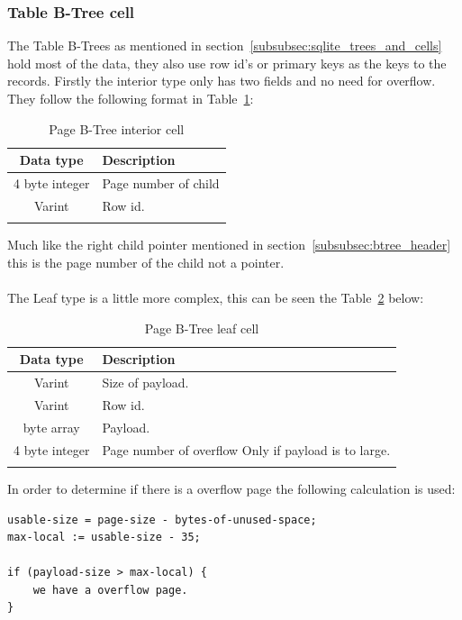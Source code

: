 \subsubsection{Table B-Tree cell}
\label{subsubsec:table_btree_cell}

The Table B-Trees as mentioned in section~\ref{subsubsec:sqlite_trees_and_cells} hold most of the data, they also use row id's or primary keys as the keys to the records. Firstly the interior type only has two fields and no need for overflow. They follow the following format in Table~\ref{tbl:table_btree_cell_interior}: 

\begin{longtable}[h]{| c | p{5cm} |}
		\hline
			\textbf{Data type} & \textbf{Description} \\ 
		\hline
		\endhead
			4 byte integer & Page number of child \\
		\hline
			Varint & Row id. \\
		\hline
	\caption{Page B-Tree interior cell}
	\label{tbl:table_btree_cell_interior}
\end{longtable}

Much like the right child pointer mentioned in section~\ref{subsubsec:btree_header} this is the page number of the child not a pointer. 
\\\\
The Leaf type is a little more complex, this can be seen the Table~\ref{tbl:table_btree_cell_leaf} below:

\begin{longtable}[h]{| c | p{5cm} |}
		\hline
			\textbf{Data type} & \textbf{Description} \\ 
		\hline
		\endhead
			Varint & Size of payload. \\
		\hline
			Varint & Row id. \\
		\hline
			byte array & Payload. \\
		\hline
			4 byte integer & Page number of overflow \newline
							  Only if payload is to large.\\
		\hline
	\caption{Page B-Tree leaf cell}
	\label{tbl:table_btree_cell_leaf}
\end{longtable}

In order to determine if there is a overflow page the following calculation is used:

\begin{lstlisting}	
usable-size = page-size - bytes-of-unused-space;
max-local := usable-size - 35;

if (payload-size > max-local) {
	we have a overflow page.
}
\end{lstlisting}

